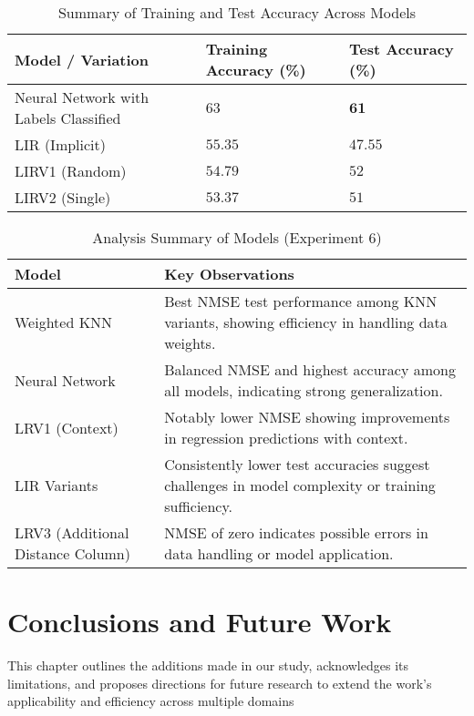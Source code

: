 \documentclass[a4paper, 12pt]{report}
\begin{document}
\begin{table}[H]
    \centering
    \caption{Summary of Training and Test Accuracy Across Models}
    \label{tab:summary_accuracy_all_models_accuracy_exp6}
    \small
    \begin{tabular}{|l|l|l|}
    \toprule
    \textbf{Model / Variation} & \textbf{Training Accuracy (\%)} & \textbf{Test Accuracy (\%)} \\
    \midrule
    Neural Network with Labels Classified & $63$ & $\mathbf{61}$ \\
    LIR (Implicit) & $55.35$ & $47.55$ \\
    LIRV1 (Random) & $54.79$ & $52$ \\
    LIRV2 (Single) & $53.37$ & $51$ \\
    \bottomrule
    \end{tabular}
\end{table}
\clearpage

\begin{table}[H]
    \centering
    \caption{Analysis Summary of Models (Experiment 6)}
    \label{tab:analysis_summary_exp6}
    \begin{tabular}{|l|l|}
    \hline
    \textbf{Model} & \textbf{Key Observations} \\
    \hline
    Weighted KNN & Best NMSE test performance among KNN variants, showing efficiency in handling data weights. \\
    \hline
    Neural Network & Balanced NMSE and highest accuracy among all models, indicating strong generalization. \\
    \hline
    LRV1 (Context) & Notably lower NMSE showing improvements in regression predictions with context. \\
    \hline
    LIR Variants & Consistently lower test accuracies suggest challenges in model complexity or training sufficiency. \\
    \hline
    LRV3 (Additional Distance Column) & NMSE of zero indicates possible errors in data handling or model application. \\
    \hline
    \end{tabular}
\end{table}

\chapter{Conclusions and Future Work}
\label{ch:Conclusions and Future Work}
This chapter outlines the additions made in our study, acknowledges its limitations, and proposes directions for future research to extend 
the work's applicability and efficiency across multiple domains
\end{document}
